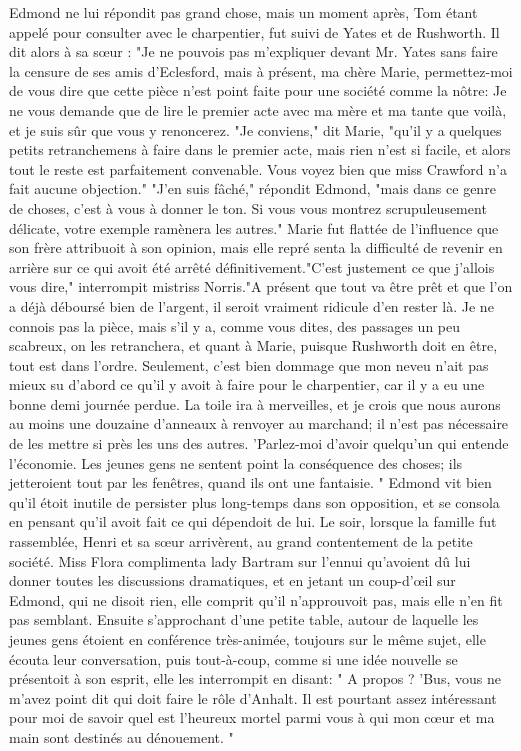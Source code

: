Edmond ne lui répondit pas grand chose, mais un moment après, Tom étant appelé pour consulter avec le charpentier, fut suivi de Yates et de Rushworth. Il dit alors à sa sœur : "Je ne pouvois pas m'expliquer devant Mr. Yates sans faire la censure de ses amis d'Eclesford, mais à présent, ma chère Marie, permettez-moi de vous dire que cette pièce n'est point faite pour une société comme la\setcounter{page}{111} nôtre: Je ne vous demande que de lire le premier acte avec ma mère et ma tante que voilà, et je suis sûr que vous y renoncerez.
"Je conviens," dit Marie, "qu'il y a quelques petits retranchemens à faire dans le premier acte, mais rien n'est si facile, et alors tout le reste est parfaitement convenable. Vous voyez bien que miss Crawford n'a fait aucune objection."
"J'en suis fâché," répondit Edmond, "mais dans ce genre de choses, c'est à vous à donner le ton. Si vous vous montrez scrupuleusement délicate, votre exemple ramènera les autres."
Marie fut flattée de l'influence que son frère attribuoit à son opinion, mais elle repré senta la difficulté de revenir en arrière sur ce qui avoit été arrêté définitivement."C'est justement ce que j'allois vous dire," interrompit mistriss Norris."A présent que tout va être prêt et que l'on a déjà déboursé bien de l'argent, il seroit vraiment ridicule d'en rester là. Je ne connois pas la pièce, mais s'il y a, comme vous dites, des passages un peu scabreux, on les retranchera, et quant à Marie, puisque Rushworth doit en être, tout est dans l'ordre. Seulement, c'est bien dommage que mon neveu n'ait pas mieux su d'abord ce qu'il y avoit à faire\setcounter{page}{112} pour le charpentier, car il y a eu une bonne demi journée perdue. La toile ira à merveilles, et je crois que nous aurons au moins une douzaine d'anneaux à renvoyer au marchand; il n'est pas nécessaire de les mettre si près les uns des autres. 'Parlez-moi d'avoir quelqu'un qui entende l'économie. Les jeunes gens ne sentent point la conséquence des choses; ils jetteroient tout par les fenêtres, quand ils ont une fantaisie. "
Edmond vit bien qu'il étoit inutile de persister plus long-temps dans son opposition, et se consola en pensant qu'il avoit fait ce qui dépendoit de lui.
Le soir, lorsque la famille fut rassemblée, Henri et sa sœur arrivèrent, au grand contentement de la petite société. Miss Flora complimenta lady Bartram sur l'ennui qu'avoient dû lui donner toutes les discussions dramatiques, et en jetant un coup-d'œil sur Edmond, qui ne disoit rien, elle comprit qu'il n'approuvoit pas, mais elle n'en fit pas semblant. Ensuite s'approchant d'une petite table, autour de laquelle les jeunes gens étoient en conférence très-animée, toujours sur le même sujet, elle écouta leur conversation, puis tout-à-coup, comme si une idée nouvelle se présentoit à son esprit, elle les interrompit en disant: " A propos ?\setcounter{page}{113} 'Bus, vous ne m'avez point dit qui doit faire le rôle d'Anhalt. Il est pourtant assez intéressant pour moi de savoir quel est l'heureux mortel parmi vous à qui mon cœur et ma main sont destinés au dénouement. "
